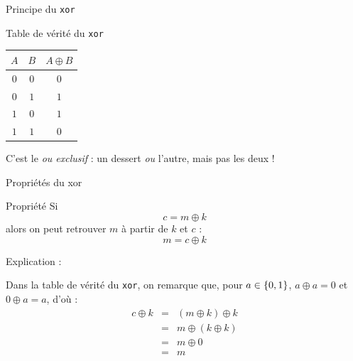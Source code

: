 \documentclass{beamer}
\begin{document}
    \begin{frame}{Principe du \texttt{xor}}%
        \begin{block}{Table de vérité du \texttt{xor}}%
            \begin{center}
                \begin{tabular}{|c|c||c|}
                    \hline
                    $A$ & $B$ & $A \oplus B$
                    \\
                    \hline
                    \hline
                    $0$ & $0$ & $0$
                    \\
                    \hline
                    $0$ & $1$ & $1$
                    \\
                    \hline
                    $1$ & $0$ & $1$
                    \\
                    \hline
                    $1$ & $1$ & $0$
                    \\
                    \hline
                \end{tabular}
            \end{center}
        \end{block}%

        C'est le \emph{ou exclusif} : un dessert \emph{ou} l'autre, mais pas les deux !
    \end{frame}%

    \begin{frame}{Propriétés du xor}%
        \begin{block}{Propriété}%
            Si
            \[
                c = m \oplus k
            \]
            alors on peut retrouver $m$ à partir de $k$ et $c$ :
            \[
                m = c \oplus k
            \]
        \end{block}%

        \vspace{12pt}
        
        Explication :

        Dans la table de vérité du \texttt{xor}, on remarque que, pour $a \in \left\{ 0, 1 \right\}$, $\boxed{a \oplus a = 0}$ et $\boxed{0 \oplus a = a}$, d'où :
        \[
            \begin{array}{rcl}
                c \oplus k
                &=&
                (m \oplus k) \oplus k
                \\
                &=&
                m \oplus (k \oplus k)
                \\
                &=&
                m \oplus 0
                \\
                &=& m
            \end{array}
        \]
    \end{frame}%
\end{document}
